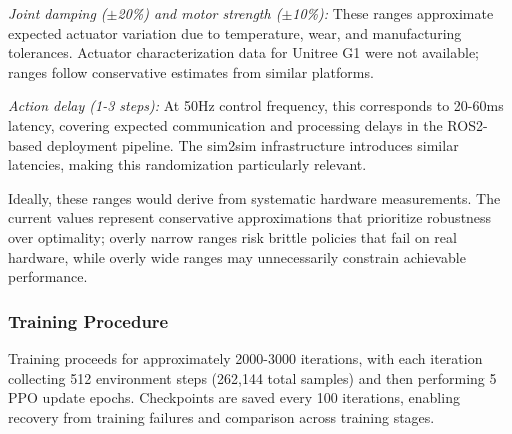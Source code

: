 \documentclass[12pt,a4paper]{article}
\begin{document}
\textit{Joint damping ($\pm$20\%) and motor strength ($\pm$10\%):} These ranges approximate expected actuator variation due to temperature, wear, and manufacturing tolerances. Actuator characterization data for Unitree G1 were not available; ranges follow conservative estimates from similar platforms.

\textit{Action delay (1-3 steps):} At 50Hz control frequency, this corresponds to 20-60ms latency, covering expected communication and processing delays in the ROS2-based deployment pipeline. The sim2sim infrastructure introduces similar latencies, making this randomization particularly relevant.

Ideally, these ranges would derive from systematic hardware measurements. The current values represent conservative approximations that prioritize robustness over optimality; overly narrow ranges risk brittle policies that fail on real hardware, while overly wide ranges may unnecessarily constrain achievable performance.

\subsubsection{Training Procedure}

Training proceeds for approximately 2000-3000 iterations, with each iteration collecting 512 environment steps (262,144 total samples) and then performing 5 PPO update epochs. Checkpoints are saved every 100 iterations, enabling recovery from training failures and comparison across training stages.
\end{document}
